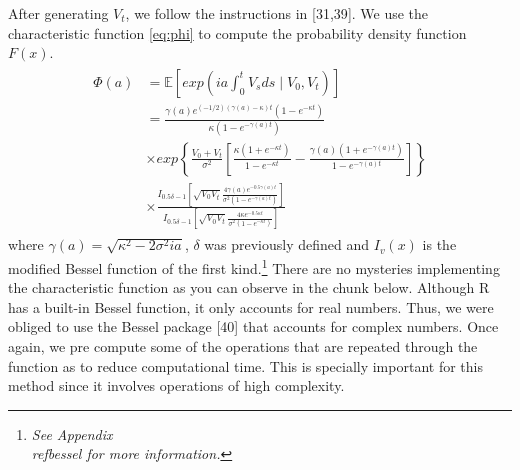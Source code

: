 \documentclass[12pt,twoside]{reedthesis}
\theoremstyle{definition}
\theoremstyle{definition}
\theoremstyle{remark}
\begin{document}
  After generating \(V_t\), we follow the instructions in {[}31,39{]}. We
  use the characteristic function \eqref{eq:phi} to compute the probability
  density function \(F(x)\).
  \begin{align} \label{eq:phi}
  \begin{split}
  \Phi(a) &= \mathbb{E}\left[ exp \left( ia \int_{0}^{t}{V_s ds} \mid V_0,V_t \right)  \right] \\[10pt]
  &= \frac{\gamma(a)e^{(-1/2)(\gamma(a)- \kappa) t} (1 - e^{- \kappa t})}{\kappa (1 - e^{- \gamma(a) t})} \\[10pt]
  &\times exp \left\{\frac{V_0 + V_t}{\sigma^2} \left[ \frac{\kappa (1 + e^{- \kappa t})}{1 - e^{- \kappa t}} - \frac{\gamma(a) (1 + e^{- \gamma(a) t})}{1 - e^{- \gamma(a) t}} \right] \right\} \\[10pt]
  &\times \frac{I_{0.5\delta - 1} \left[ \sqrt{V_0 V_t} \frac{4 \gamma(a) e^{-0.5 \gamma(a) t}}{\sigma^2 (1 - e^{- \gamma(a) t})} \right]}{I_{0.5\delta - 1}  \left[ \sqrt{V_0 V_t} \frac{4 \kappa e^{-0.5 \kappa t}}{\sigma^2 (1 - e^{- \kappa t})} \right]}
  \end{split}
  \end{align}
  where \(\gamma(a) = \sqrt{\kappa^2 - 2 \sigma^2 i a}\), \(\delta\) was
  previously defined and \(I_v(x)\) is the modified Bessel function of the
  first kind.\footnote{\textit{See Appendix  \\ref{bessel} for more information.}}
  There are no mysteries implementing the characteristic function as you
  can observe in the chunk below. Although R has a built-in Bessel
  function, it only accounts for real numbers. Thus, we were obliged to
  use the Bessel package {[}40{]} that accounts for complex numbers. Once
  again, we pre compute some of the operations that are repeated through
  the function as to reduce computational time. This is specially
  important for this method since it involves operations of high
  complexity.
  
\end{document}
